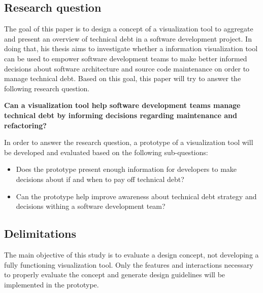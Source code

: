 \subsection{Research question}

The goal of this paper is to design a concept of a visualization tool to aggregate and present an overview of technical debt in a software development project.
In doing that, his thesis aims to investigate whether a information visualization tool can be used to empower software development teams to make better informed decisions about software architecture and source code maintenance on order to manage technical debt.
Based on this goal, this paper will try to answer the following research question.

\smallskip
\textbf{
Can a visualization tool help software development teams manage technical debt by informing decisions regarding maintenance and refactoring?
}
\smallskip

In order to answer the research question, a prototype of a visualization tool will be developed and evaluated based on the following sub-questions:
\begin{itemize}
\item Does the prototype present enough information for developers to make decisions about if and when to pay off technical debt?
\item Can the prototype help improve awareness about technical debt strategy and decisions withing a software development team?
\end{itemize}

\subsection{Delimitations}
The main objective of this study is to evaluate a design concept, not developing a fully functioning visualization tool.
Only the features and interactions necessary to properly evaluate the concept and generate design guidelines will be implemented in the prototype.